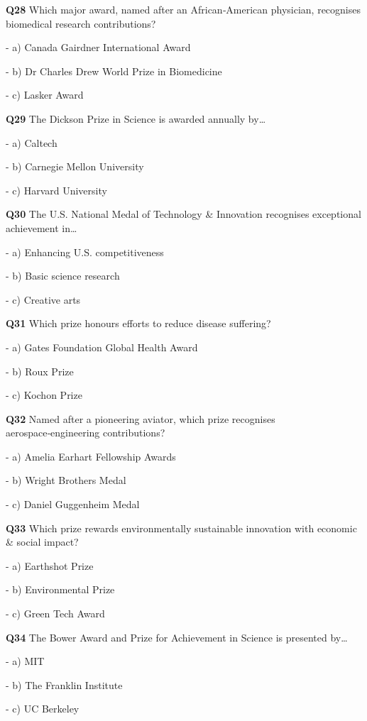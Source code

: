 \textbf{Q28} Which major award, named after an African‑American physician, recognises biomedical research contributions?\par
\quad - a) Canada Gairdner International Award\par
\quad - b) Dr Charles Drew World Prize in Biomedicine\par
\quad - c) Lasker Award\par

\textbf{Q29} The Dickson Prize in Science is awarded annually by…\par
\quad - a) Caltech\par
\quad - b) Carnegie Mellon University\par
\quad - c) Harvard University\par

\textbf{Q30} The U.S. National Medal of Technology & Innovation recognises exceptional achievement in…\par
\quad - a) Enhancing U.S. competitiveness\par
\quad - b) Basic science research\par
\quad - c) Creative arts\par

\textbf{Q31} Which prize honours efforts to reduce disease suffering?\par
\quad - a) Gates Foundation Global Health Award\par
\quad - b) Roux Prize\par
\quad - c) Kochon Prize\par

\textbf{Q32} Named after a pioneering aviator, which prize recognises aerospace‑engineering contributions?\par
\quad - a) Amelia Earhart Fellowship Awards\par
\quad - b) Wright Brothers Medal\par
\quad - c) Daniel Guggenheim Medal\par

\textbf{Q33} Which prize rewards environmentally sustainable innovation with economic & social impact?\par
\quad - a) Earthshot Prize\par
\quad - b) Environmental Prize\par
\quad - c) Green Tech Award\par

\textbf{Q34} The Bower Award and Prize for Achievement in Science is presented by…\par
\quad - a) MIT\par
\quad - b) The Franklin Institute\par
\quad - c) UC Berkeley\par

